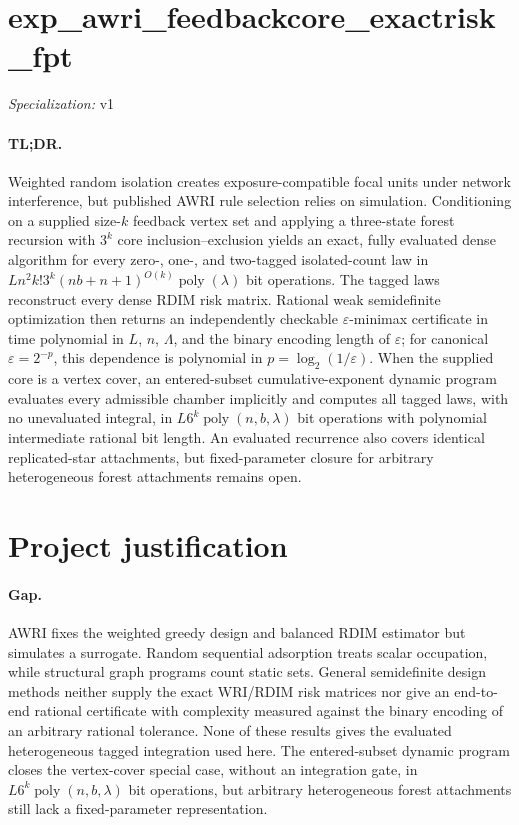 \documentclass{article}
\begin{document}
\sloppy

\section*{exp\_\allowbreak{}awri\_\allowbreak{}feedbackcore\_\allowbreak{}exactrisk\_\allowbreak{}fpt}

\noindent\textit{Specialization:} v1\par

\paragraph{TL;DR.} Weighted random isolation creates exposure-compatible focal units under network interference, but published AWRI rule selection relies on simulation. Conditioning on a supplied size-\(k\) feedback vertex set and applying a three-state forest recursion with \(3^k\) core inclusion--exclusion yields an exact, fully evaluated dense algorithm for every zero-, one-, and two-tagged isolated-count law in \(Ln^2k!3^k(nb+n+1)^{O(k)}\operatorname{poly}(\lambda)\) bit operations. The tagged laws reconstruct every dense RDIM risk matrix. Rational weak semidefinite optimization then returns an independently checkable \(\varepsilon\)-minimax certificate in time polynomial in \(L\), \(n\), \(\Lambda\), and the binary encoding length of \(\varepsilon\); for canonical \(\varepsilon=2^{-p}\), this dependence is polynomial in \(p=\log_2(1/\varepsilon)\). When the supplied core is a vertex cover, an entered-subset cumulative-exponent dynamic program evaluates every admissible chamber implicitly and computes all tagged laws, with no unevaluated integral, in \(L6^k\operatorname{poly}(n,b,\lambda)\) bit operations with polynomial intermediate rational bit length. An evaluated recurrence also covers identical replicated-star attachments, but fixed-parameter closure for arbitrary heterogeneous forest attachments remains open.

\section{Project justification}

\paragraph{Gap.} AWRI fixes the weighted greedy design and balanced RDIM estimator but simulates a surrogate. Random sequential adsorption treats scalar occupation, while structural graph programs count static sets. General semidefinite design methods neither supply the exact WRI/RDIM risk matrices nor give an end-to-end rational certificate with complexity measured against the binary encoding of an arbitrary rational tolerance. None of these results gives the evaluated heterogeneous tagged integration used here. The entered-subset dynamic program closes the vertex-cover special case, without an integration gate, in \(L6^k\operatorname{poly}(n,b,\lambda)\) bit operations, but arbitrary heterogeneous forest attachments still lack a fixed-parameter representation.
\end{document}
